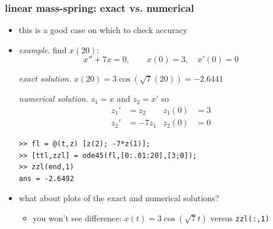 \documentclass[dvipsnames,colorlinks]{beamer}
\begin{document}
\begin{frame}[fragile]
\frametitle{linear mass-spring: exact vs. numerical}

\begin{itemize}
\item this is a good case on which to check accuracy
\item \emph{example}.  find $x(20)$:
    $$x''+ 7 x = 0, \qquad x(0)=3, \quad x'(0)=0$$

\medskip
\noindent \emph{exact solution.}  $x(20)=3 \cos(\sqrt{7}(20)) = -2.6441$

\bigskip
\noindent \emph{numerical solution.}  $z_1=x$ and $z_2=x'$ so
\begin{align*}
z_1' &= z_2 & z_1(0)&=3 \\
z_2' &= - 7 z_1 & z_2(0)&=0
\end{align*}

\begin{Verbatim}[fontsize=\footnotesize]
>> fl = @(t,z) [z(2); -7*z(1)];
>> [ttl,zzl] = ode45(fl,[0:.01:20],[3;0]);
>> zzl(end,1)
ans = -2.6492
\end{Verbatim}

\item what about plots of the exact and numerical solutions?
    \begin{itemize}
    \item you won't see difference: $x(t)=3 \cos(\sqrt{7} t)$ versus \texttt{zzl(:,1)}
    \end{itemize}
\end{itemize}
\end{frame}
\end{document}
